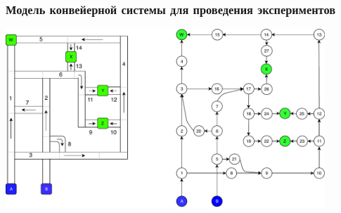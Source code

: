 \documentclass{beamer}
\begin{document}
\begin{frame}
  \frametitle{Модель конвейерной системы для проведения экспериментов}
  \begin{center}
    \includegraphics[width=0.9\textwidth]{test-conveyors} 
  \end{center}
\end{frame}

\end{document}
